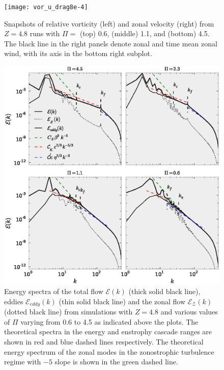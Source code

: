 \documentclass{jfm}
\begin{document}
\begin{figure}
\begin{center}
\texttt{[image: vor\_u\_drag8e-4]}\caption{Snapshots of relative vorticity (left) and zonal velocity (right)
from $Z=4.8$ runs with $\Pi=$ (top) 0.6, (middle) 1.1, and (bottom)
4.5. The black line in the right panels denote zonal and time mean
zonal wind, with its axis in the bottom right subplot.}
\label{vor_u_snapshot_drag8e-4}
\end{center}
\end{figure}


\begin{figure}
\begin{center}
\includegraphics[width=6in]{E_ZKE_EKE_spectra_drag8e-4}\caption{Energy spectra of the total flow $\mathcal{E}(k)$ (thick solid
black line), eddies $\mathcal{E}_{eddy}(k)$ (thin solid black line)
and the zonal flow $\mathcal{E}_{\mathcal{Z}}(k)$ (dotted black line)
from simulations with $Z=4.8$ and various values of $\Pi$ varying
from 0.6 to 4.5 as indicated above the plots. The theoretical spectra
in the energy and enstrophy cascade ranges are shown in red and blue dashed
lines respectively. The theoretical energy spectrum of the zonal modes in the 
zonostrophic turbulence regime with $-5$ slope is shown in the green
dashed line.}
\label{E_EKE_ZKE_spectrum_drag8e-4}
\end{center}
\end{figure}
\end{document}
